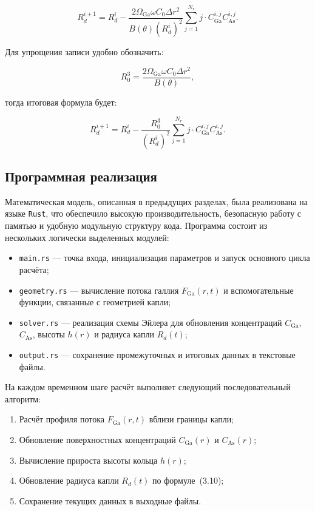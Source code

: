 \documentclass[14pt,oneside]{extarticle}
\begin{document}
\begin{equation}
R_d^{i+1} = R_d^i - \frac{2 \Omega_{\text{Ga}} \omega C_0 \Delta r^2}{B(\theta) (R_d^i)^2} \sum_{j=1}^{N_r} j \cdot C_{\text{Ga}}^{i,j} C_{\text{As}}^{i,j}.
\end{equation}

Для упрощения записи удобно обозначить:

\begin{equation}
R_0^3 = \frac{2 \Omega_{\text{Ga}} \omega C_0 \Delta r^2}{B(\theta)},
\end{equation}

тогда итоговая формула будет:

\begin{equation}
R_d^{i+1} = R_d^i - \frac{R_0^3}{(R_d^i)^2} \sum_{j=1}^{N_r} j \cdot C_{\text{Ga}}^{i,j} C_{\text{As}}^{i,j}.
\end{equation}
    
\subsection{Программная реализация}

Математическая модель, описанная в предыдущих разделах, была реализована на языке \texttt{Rust}, что обеспечило высокую производительность, безопасную работу с памятью и удобную модульную структуру кода. Программа состоит из нескольких логически выделенных модулей:

\begin{itemize}
    \item \texttt{main.rs} — точка входа, инициализация параметров и запуск основного цикла расчёта;
    \item \texttt{geometry.rs} — вычисление потока галлия $F_{\text{Ga}}(r, t)$ и вспомогательные функции, связанные с геометрией капли;
    \item \texttt{solver.rs} — реализация схемы Эйлера для обновления концентраций $C_{\text{Ga}}$, $C_{\text{As}}$, высоты $h(r)$ и радиуса капли $R_d(t)$;
    \item \texttt{output.rs} — сохранение промежуточных и итоговых данных в текстовые файлы.
\end{itemize}

На каждом временном шаге расчёт выполняет следующий последовательный алгоритм:
\begin{enumerate}
    \item Расчёт профиля потока $F_{\text{Ga}}(r, t)$ вблизи границы капли;
    \item Обновление поверхностных концентраций $C_{\text{Ga}}(r)$ и $C_{\text{As}}(r)$;
    \item Вычисление прироста высоты кольца $h(r)$;
    \item Обновление радиуса капли $R_d(t)$ по формуле~(3.10);
    \item Сохранение текущих данных в выходные файлы.
\end{enumerate}
\end{document}
